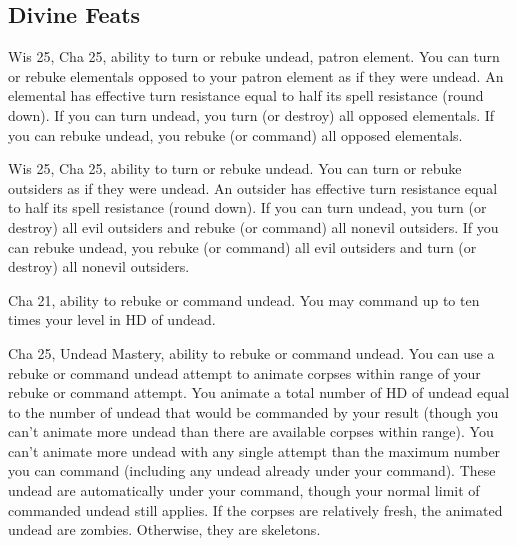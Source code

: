 \subsection{Divine Feats}
{Wis 25, Cha 25, ability to turn or rebuke undead, patron element.}
{
  You can turn or rebuke elementals opposed to your patron element as if they were undead. An elemental has effective turn resistance equal to half its spell resistance (round down). If you can turn undead, you turn (or destroy) all opposed elementals. If you can rebuke undead, you rebuke (or command) all opposed elementals.
}

{Wis 25, Cha 25, ability to turn or rebuke undead.}
{
  You can turn or rebuke outsiders as if they were undead. An outsider has effective turn resistance equal to half its spell resistance (round down). If you can turn undead, you turn (or destroy) all evil outsiders and rebuke (or command) all nonevil outsiders. If you can rebuke undead, you rebuke (or command) all evil outsiders and turn (or destroy) all nonevil outsiders.
}

{Cha 21, ability to rebuke or command undead.}
{You may command up to ten times your level in HD of undead.}

{Cha 25, Undead Mastery, ability to rebuke or command undead.}
{You can use a rebuke or command undead attempt to animate corpses within range of your rebuke or command attempt. You animate a total number of HD of undead equal to the number of undead that would be commanded by your result (though you can't animate more undead than there are available corpses within range). You can't animate more undead with any single attempt than the maximum number you can command (including any undead already under your command). These undead are automatically under your command, though your normal limit of commanded undead still applies. If the corpses are relatively fresh, the animated undead are zombies. Otherwise, they are skeletons.}
